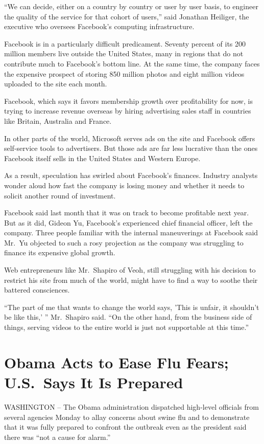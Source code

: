 \documentclass[12pt,a4paper,onecolumn]{article}
\begin{document}
``We can decide, either on a country by country or user by user basis, to engineer the quality of
the service for that cohort of users,'' said Jonathan Heiliger, the executive who oversees
Facebook's computing infrastructure.

Facebook is in a particularly difficult predicament. Seventy percent of its 200 million members live
outside the United States, many in regions that do not contribute much to Facebook's bottom line. At
the same time, the company faces the expensive prospect of storing 850 million photos and eight
million videos uploaded to the site each month.

Facebook, which says it favors membership growth over profitability for now, is trying to increase
revenue overseas by hiring advertising sales staff in countries like Britain, Australia and France.

In other parts of the world, Microsoft serves ads on the site and Facebook offers self-service tools
to advertisers. But those ads are far less lucrative than the ones Facebook itself sells in the
United States and Western Europe.

As a result, speculation has swirled about Facebook's finances. Industry analysts wonder aloud how
fast the company is losing money and whether it needs to solicit another round of investment.

Facebook said last month that it was on track to become profitable next year. But as it did, Gideon
Yu, Facebook's experienced chief financial officer, left the company. Three people familiar with the
internal maneuverings at Facebook said Mr.~Yu objected to such a rosy projection as the company was
struggling to finance its expensive global growth.

Web entrepreneurs like Mr.~Shapiro of Veoh, still struggling with his decision to restrict his site
from much of the world, might have to find a way to soothe their battered consciences.

``The part of me that wants to change the world says, 'This is unfair, it shouldn't be like this,'
'' Mr.~Shapiro said. ``On the other hand, from the business side of things, serving videos to the
entire world is just not supportable at this time.''

\section{Obama Acts to Ease Flu Fears; U.S.~Says It Is Prepared}

WASHINGTON -- The Obama administration dispatched high-level officials from several agencies Monday
to allay concerns about swine flu and to demonstrate that it was fully prepared to confront the
outbreak even as the president said there was ``not a cause for alarm.''
\end{document}
